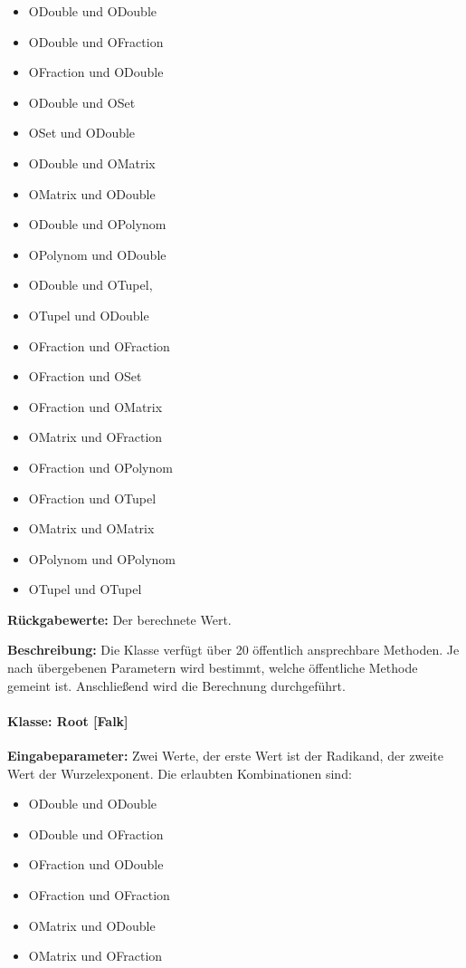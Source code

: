 \begin{itemize}
\item ODouble und ODouble
\item ODouble und OFraction
\item OFraction und ODouble
\item ODouble und OSet
\item OSet und ODouble
\item ODouble und OMatrix
\item OMatrix und ODouble
\item ODouble und OPolynom
\item OPolynom und ODouble
\item ODouble und OTupel,
\item OTupel und ODouble
\item OFraction und OFraction
\item OFraction und OSet
\item OFraction und OMatrix
\item OMatrix und OFraction
\item OFraction und OPolynom
\item OFraction und OTupel
\item OMatrix und OMatrix
\item OPolynom und OPolynom 
\item OTupel und OTupel 
\end{itemize}

\textbf{Rückgabewerte: }Der berechnete Wert. 

\textbf{Beschreibung: }Die Klasse verfügt über 20 öffentlich ansprechbare Methoden. Je nach übergebenen Parametern wird bestimmt, welche öffentliche Methode gemeint ist. Anschließend wird die Berechnung durchgeführt. 

\paragraph{Klasse: Root [Falk]}

\textbf{Eingabeparameter: }Zwei Werte, der erste Wert ist der Radikand, der zweite Wert der Wurzelexponent. Die erlaubten Kombinationen sind: 

\begin{itemize}
\item ODouble und ODouble
\item ODouble und OFraction
\item OFraction und ODouble 
\item OFraction und OFraction
\item OMatrix und ODouble
\item OMatrix und OFraction
\end{itemize}

